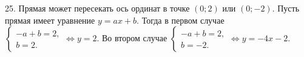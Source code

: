 25. Прямая может пересекать ось ординат в точке $(0;2)$ или $(0;-2).$ Пусть прямая имеет уравнение $y=ax+b.$ Тогда в первом случае $\begin{cases}-a+b=2,\\ b=2.\end{cases}\Leftrightarrow y=2.$ Во втором случае $\begin{cases}-a+b=2,\\ b=-2.\end{cases}\Leftrightarrow y=-4x-2.$\\
